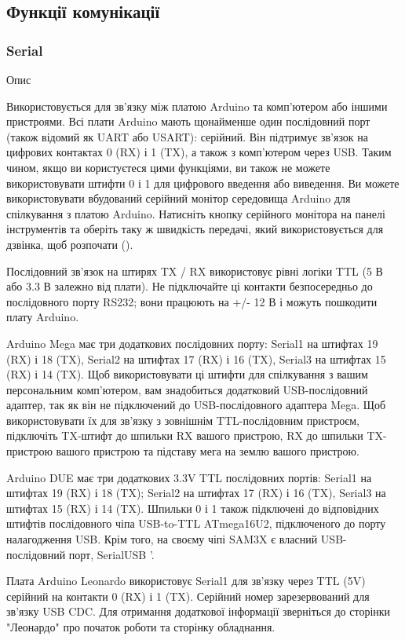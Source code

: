 \documentclass[12pt,a4paper]{report}  %
\begin{document}
\subsection{Функції комунікації}

\subsubsection{Serial}\label{Serial}

Опис

Використовується для зв'язку між платою Arduino та комп'ютером або іншими пристроями. Всі плати Arduino мають щонайменше один послідовний порт (також відомий як UART або USART): серійний. Він підтримує зв'язок на цифрових контактах 0 (RX) і 1 (TX), а також з комп'ютером через USB. Таким чином, якщо ви користуєтеся цими функціями, ви також не можете використовувати штифти 0 і 1 для цифрового введення або виведення.
Ви можете використовувати вбудований серійний монітор середовища Arduino для спілкування з платою Arduino. Натисніть кнопку серійного монітора на панелі інструментів та оберіть таку ж швидкість передачі, який використовується для дзвінка, щоб розпочати ().

Послідовний зв'язок на штирях TX / RX використовує рівні логіки TTL (5 В або 3.3 В залежно від плати). Не підключайте ці контакти безпосередньо до послідовного порту RS232; вони працюють на +/- 12 В і можуть пошкодити плату Arduino.

Arduino Mega має три додаткових послідовних порту: Serial1 на штифтах 19 (RX) і 18 (TX), Serial2 на штифтах 17 (RX) і 16 (TX), Serial3 на штифтах 15 (RX) і 14 (TX). Щоб використовувати ці штифти для спілкування з вашим персональним комп'ютером, вам знадобиться додатковий USB-послідовний адаптер, так як він не підключений до USB-послідовного адаптера Mega. Щоб використовувати їх для зв'язку з зовнішнім TTL-послідовним пристроєм, підключіть TX-штифт до шпильки RX вашого пристрою, RX до шпильки TX-пристрою вашого пристрою та підставу мега на землю вашого пристрою.

Arduino DUE має три додаткових 3.3V TTL послідовних портів: Serial1 на штифтах 19 (RX) і 18 (TX); Serial2 на штифтах 17 (RX) і 16 (TX), Serial3 на штифтах 15 (RX) і 14 (TX). Шпильки 0 і 1 також підключені до відповідних штифтів послідовного чіпа USB-to-TTL ATmega16U2, підключеного до порту налагодження USB. Крім того, на своєму чіпі SAM3X є власний USB-послідовний порт, SerialUSB '.

Плата Arduino Leonardo використовує Serial1 для зв'язку через TTL (5V) серійний на контакти 0 (RX) і 1 (TX). Серійний номер зарезервований для зв'язку USB CDC. Для отримання додаткової інформації зверніться до сторінки "Леонардо" про початок роботи та сторінку обладнання.
\end{document}
